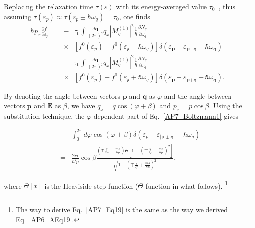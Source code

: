 %
Replacing the relaxation time $\tau(\varepsilon)$ with its energy-averaged value $\tau_0$~\cite{Ziman:2001aa}, thus assuming $\tau(\varepsilon_p)\approx\tau(\varepsilon_p\pm\hbar\omega_q)=\tau_0$, one finds
%
\begin{eqnarray}
\label{AP7_Boltzmann1}
\hbar p_x\frac{\partial f^0}{\partial \varepsilon_p}
=&-&\tau_0\int \frac{d\textbf{q}}{(2\pi)^2}q_x|M^{(1)}_q|^2\frac{1}{\hbar}\frac{\partial N_q}{\partial \omega_q} \\ \nonumber
&\times&\left[f^0(\varepsilon_p)-f^0(\varepsilon_{p}-\hbar\omega_q)\right]
\delta(\varepsilon_{\textbf{p}}-\varepsilon_{\textbf{p}-\textbf{q}}-\hbar\omega_\textbf{q})\\
\nonumber
&-&\tau_0\int \frac{d\textbf{q}}{(2\pi)^2}q_x|M^{(1)}_q|^2\frac{1}{\hbar}\frac{\partial N_q}{\partial \omega_q} \\ \nonumber
&\times&\left[f^0(\varepsilon_p)-f^0(\varepsilon_{p}+\hbar\omega_q)\right]
\delta(\varepsilon_{\textbf{p}}-\varepsilon_{\textbf{p}+\textbf{q}}+\hbar\omega_\textbf{q}).
\end{eqnarray}
%

By denoting the angle between vectors $\textbf{p}$ and $\textbf{q}$ as $\varphi$ and the angle between vectors $\textbf{p}$ and $\textbf{E}$ as $\beta$, we have $q_x=q\cos(\varphi+\beta)$ and $p_x=p\cos\beta$.
Using the substitution technique, the $\varphi$-dependent part of Eq.~\eqref{AP7_Boltzmann1} gives
%
\begin{footnotesize}
\begin{eqnarray}
\label{AP7_Eq19}
    &~&\int_0^{2\pi} d\varphi\cos (\varphi+\beta)\delta(\varepsilon_p-\varepsilon_{|\mathbf{p}\pm\mathbf{q}|}\pm\hbar\omega_q)\\ \nonumber
    &=&\frac{2m}{\hbar^2p}\cos\beta\frac{\left(\mp\frac{q}{2p}+\frac{ms}{\hbar p}\right)\Theta\left[1-\left(\mp\frac{q}{2p}+\frac{ms}{\hbar p}\right)^2\right]}{\sqrt{1-\left(\mp\frac{q}{2p}+\frac{ms}{\hbar p}\right)^2}},
\end{eqnarray}
\end{footnotesize}
%
where $\Theta[x]$ is the Heaviside step function ($\Theta$-function in what follows).
\footnote{The way to derive Eq.~\eqref{AP7_Eq19} is the same as the way we derived Eq.~\eqref{AP6_AEq19}.}

